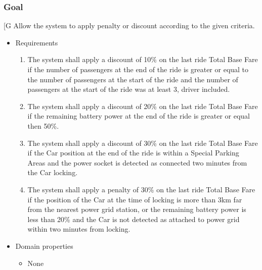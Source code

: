     \subsubsection{Goal }
    {[}G\arabic{goalctr}{]}
    Allow the system to apply penalty or discount according to the given criteria.
    \begin{itemize}
        \item Requirements
        \begin{enumerate}[REQ]
    			\item The system shall apply a discount of 10\% on the last ride Total Base Fare if the number of passengers at the end of the ride is greater or equal to the number of passengers at the start of the ride and the number of passengers at the start of the ride was at least 3, driver included.
    			\item The system shall apply a discount of 20\% on the last ride Total Base Fare if the remaining battery power at the end of the ride is greater or equal then 50\%.
    			\item The system shall apply a discount of 30\% on the last ride Total Base Fare if the Car position at the end of the ride is within a Special Parking Areas and the power socket is detected as connected two minutes from the Car locking.
    			\item The system shall apply a penalty of 30\% on the last ride Total Base Fare if the position of the Car at the time of locking is more than 3km far from the nearest power grid station, or the remaining battery power is less than 20\% and the Car is not detected as attached to power grid within two minutes from locking.
        \end{enumerate}
        \item Domain properties
        \begin{itemize}
    			\item None
        \end{itemize}
    \end{itemize} 

